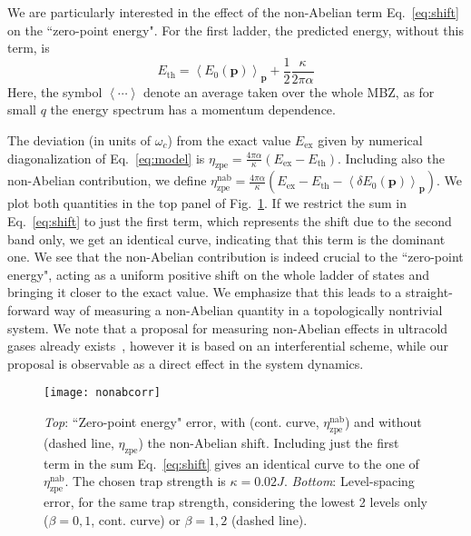 \documentclass[twocolumn, 10pt, aps, superscriptaddress, floatfix, showpacs, pra, citeautoscript]{revtex4-1}
\newcommand{\vt}[1]{\mathbf{#1}}
\begin{document}
We are particularly interested in the effect of the non-Abelian term
Eq.~\eqref{eq:shift} on the ``zero-point energy". For the first
ladder, the predicted energy, without this term, is
\begin{equation}
  E_{\text{th}} = \left<E_0(\vt{p})\right>_{\vt{p}} + \frac{1}{2}\frac{\kappa}{2\pi\alpha}
\end{equation}
Here, the symbol $\left<\cdots\right>$ denote an average taken over
the whole MBZ, as for small $q$ the energy spectrum has a momentum
dependence.

The deviation (in units of $\omega_c$) from the exact value
$E_{\text{ex}}$ given by numerical diagonalization of
Eq.~\eqref{eq:model} is
$\eta_{\text{zpe}} = \frac{4\pi\alpha}{\kappa} (E_{\text{ex}} -
E_{\text{th}})$.
Including also the non-Abelian contribution, we define
$\eta_{\text{zpe}}^{\text{nab}} = \frac{4\pi\alpha}{\kappa}
(E_{\text{ex}} - E_{\text{th}} - \left<\delta
  E_0(\vt{p})\right>_{\vt{p}})$.
We plot both quantities in the top panel of Fig.~\ref{fig:zpe}. If we
restrict the sum in Eq.~\eqref{eq:shift} to just the first term, which
represents the shift due to the second band only, we get an identical
curve, indicating that this term is the dominant one.  We see that the
non-Abelian contribution is indeed crucial to the ``zero-point
energy", acting as a uniform positive shift on the whole ladder of
states and bringing it closer to the exact value. We emphasize that
this leads to a straight-forward way of measuring a non-Abelian
quantity in a topologically nontrivial system. We note that a proposal
for measuring non-Abelian effects in ultracold gases already
exists~\cite{Grusdt2014nonabelian}, however it is based on an
interferential scheme, while our proposal is observable as a direct
effect in the system dynamics.

\begin{figure}[htb]\centering
  \texttt{[image: nonabcorr]} %
  \caption{\emph{Top}: ``Zero-point energy" error, with (cont. curve,
    $\eta_{\text{zpe}}^{\text{nab}}$) and without (dashed line,
    $\eta_{\text{zpe}}$) the non-Abelian shift. Including just the
    first term in the sum Eq.~\eqref{eq:shift} gives an identical
    curve to the one of $\eta_{\text{zpe}}^{\text{nab}}$. The chosen
    trap strength is $\kappa = 0.02 J$.  \emph{Bottom}: Level-spacing
    error, for the same trap strength, considering the lowest 2 levels
    only ($\beta = 0,1$, cont. curve) or $\beta = 1,2$ (dashed line).}
  \label{fig:zpe}
\end{figure}
\end{document}
